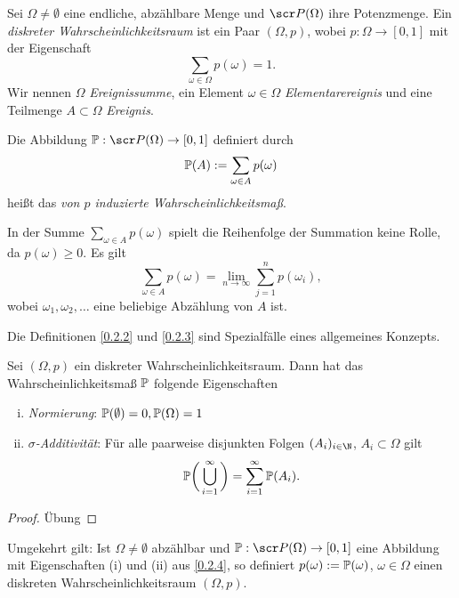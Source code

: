 \begin{df} \label{0.2.2}
	Sei $\Omega \neq \emptyset$ eine endliche, abzählbare Menge und $\scr P(\Omega)$ ihre Potenzmenge.
	Ein \emph{diskreter Wahrscheinlichkeitsraum} ist ein Paar $(\Omega, p)$, wobei $p: \Omega \to [0,1]$ mit der Eigenschaft
	\[
		\sum_{\omega \in \Omega} p(\omega) = 1.
	\]
	Wir nennen $\Omega$ \emph{Ereignissumme}, ein Element $\omega \in \Omega$ \emph{Elementarereignis} und eine Teilmenge $A \subset \Omega$ \emph{Ereignis}.
\end{df}

\begin{df} \label{0.2.3}
	Die Abbildung $\P : \scr P(\Omega) \to [0,1]$ definiert durch
	\[
		\P(A) := \sum_{\omega \in A} p(\omega)
	\]
	heißt das \emph{von $p$ induzierte Wahrscheinlichkeitsmaß}.
\end{df}

\begin{nt*}
	In der Summe $\sum_{\omega \in A} p(\omega)$ spielt die Reihenfolge der Summation keine Rolle, da $p(\omega) \ge 0$.
	Es gilt
	\[
		\sum_{\omega \in A} p(\omega)
		= \lim_{n\to \infty} \sum_{j=1}^n p(\omega_i),
	\]
	wobei $\omega_1, \omega_2, \dotsc$ eine beliebige Abzählung von $A$ ist.
\end{nt*}

Die Definitionen \ref{0.2.2} und \ref{0.2.3} sind Spezialfälle eines allgemeines Konzepts.

\begin{nt} \label{0.2.4}
	Sei $(\Omega, p)$ ein diskreter Wahrscheinlichkeitsraum.
	Dann hat das Wahrscheinlichkeitsmaß $\P$ folgende Eigenschaften
	\begin{enumerate}[(i)]
		\item
			\emph{Normierung}:
			$\P(\emptyset) = 0, \P(\Omega) = 1$
		\item
			\emph{$\sigma$-Additivität}:
			Für alle paarweise disjunkten Folgen $(A_i)_{i \in \N}$, $A_i \subset \Omega$ gilt
			\[
				\P \bigg( \bigcup_{i=1}^\infty \bigg) = \sum_{i=1}^\infty \P(A_i).
			\]
	\end{enumerate}
	\begin{proof}
		Übung
	\end{proof}
\end{nt}

\begin{nt} \label{0.2.5}
	Umgekehrt gilt:
	Ist $\Omega \neq \emptyset$ abzählbar und $\P : \scr P(\Omega) \to [0,1]$ eine Abbildung mit Eigenschaften (i) und (ii) aus \ref{0.2.4}, so definiert $p(\omega) := \P({\omega})$, $\omega \in \Omega$ einen diskreten Wahrscheinlichkeitsraum $(\Omega, p)$.
\end{nt}

